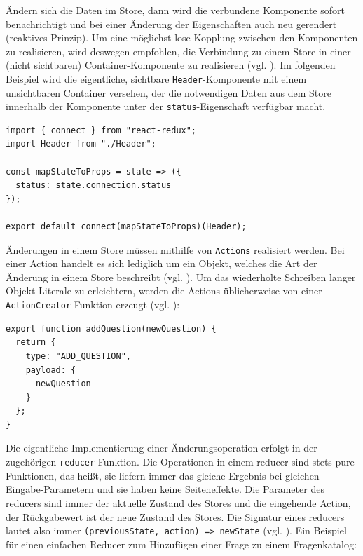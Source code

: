 Ändern sich die Daten im Store, dann wird die verbundene Komponente sofort benachrichtigt und bei einer Änderung der Eigenschaften auch neu gerendert (reaktives Prinzip). Um eine möglichst lose Kopplung zwischen den Komponenten zu realisieren, wird deswegen empfohlen, die Verbindung zu einem Store in einer (nicht sichtbaren) Container-Komponente zu realisieren (vgl. \cite[Abschnitt „Presentational and Container Components“]{web:redux_react}). Im folgenden Beispiel wird die eigentliche, sichtbare \texttt{Header}-Komponente mit einem unsichtbaren Container versehen, der die notwendigen Daten aus dem Store innerhalb der Komponente unter der \texttt{status}-Eigenschaft verfügbar macht.

\begin{minipage}{\linewidth}
\begin{lstlisting}[caption={Über den connect-Aufruf beim Exportieren der Komponente wird sie mit dem Store verbunden. (aus:  src/client/components/ClientHeaderContainer.js)}]
import { connect } from "react-redux";
import Header from "./Header";

const mapStateToProps = state => ({
  status: state.connection.status
});

export default connect(mapStateToProps)(Header);
\end{lstlisting}
\end{minipage}

Änderungen in einem Store müssen mithilfe von \texttt{Actions} realisiert werden. Bei einer Action handelt es sich lediglich um ein Objekt, welches die Art der Änderung in einem Store beschreibt (vgl. \cite[Abschnitt „Actions“]{web:redux_actions}). Um das wiederholte Schreiben langer Objekt-Literale zu erleichtern, werden die Actions üblicherweise von einer  \texttt{ActionCreator}-Funktion erzeugt (vgl. \cite[Abschnitt „Action Creators“]{web:redux_actions}):

\begin{minipage}{\linewidth}
\begin{lstlisting}[caption={Ein Action-Objekt ist die Beschreibung einer Änderungsoperation und wird in einem ActionCreator erzeugt.}]
export function addQuestion(newQuestion) {
  return {
    type: "ADD_QUESTION",
    payload: {
      newQuestion
    }
  };
}
\end{lstlisting}
\end{minipage}

Die eigentliche Implementierung einer Änderungsoperation erfolgt in der zugehörigen \texttt{reducer}-Funktion. Die Operationen in einem reducer sind stets pure Funktionen, das heißt, sie liefern immer das gleiche Ergebnis bei gleichen Eingabe-Parametern und sie haben keine Seiteneffekte. Die Parameter des reducers sind immer der aktuelle Zustand des Stores und die eingehende Action, der Rückgabewert ist der neue Zustand des Stores. Die Signatur eines reducers lautet also immer \texttt{(previousState, action) => newState} (vgl. \cite{web:redux_reducers}). Ein Beispiel für einen einfachen Reducer zum Hinzufügen einer Frage zu einem Fragenkatalog:


